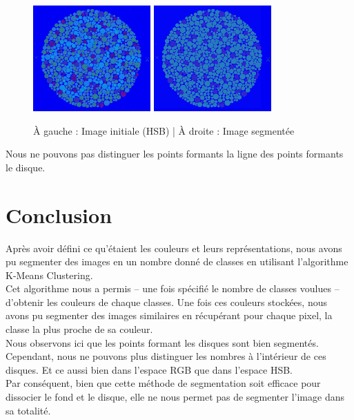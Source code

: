 \documentclass[a4paper]{article}
\begin{document}
\begin{figure}[H]
\begin{center}
\includegraphics[width=170px]{../resultats/cas_4_dalton_ligne_hsb.png}
\includegraphics[width=170px]{../resultats/cas_4_dalton_ligne_hsb_seg.png}
\end{center}
\caption{À gauche : Image initiale (HSB) | À droite : Image segmentée}
\end{figure}

Nous ne pouvons pas distinguer les points formants la ligne des points formants le disque.

\clearpage

\section{Conclusion}
Après avoir défini ce qu'étaient les couleurs et leurs représentations, nous avons pu segmenter des images en un nombre donné de classes en utilisant l'algorithme K-Means Clustering.\\

Cet algorithme nous a permis -- une fois spécifié le nombre de classes voulues -- d'obtenir les couleurs de chaque classes. Une fois ces couleurs stockées, nous avons pu segmenter des images similaires en récupérant pour chaque pixel, la classe la plus proche de sa couleur.\\

Nous observons ici que les points formant les disques sont bien segmentés. Cependant, nous ne pouvons plus distinguer les nombres à l'intérieur de ces disques. Et ce aussi bien dans l'espace RGB que dans l'espace HSB.\\

Par conséquent, bien que cette méthode de segmentation soit efficace pour dissocier le fond et le disque, elle ne nous permet pas de segmenter l'image dans sa totalité.

\clearpage
\end{document}
